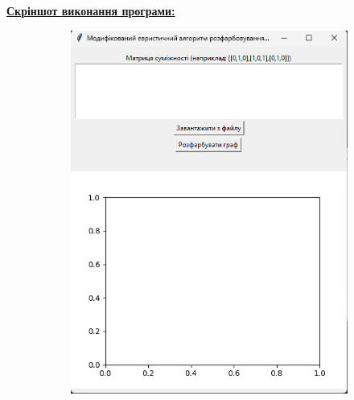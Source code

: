 \documentclass[12pt,a4paper]{article}
\begin{document}
    \newpage

    \textbf{\underline{Скріншот виконання програми:}}

    \begin{figure}[htbp]
        \begin{subfigure}{0.35\textwidth}
            \includegraphics[width=\linewidth]{ex0.png}
            \label{fig:a}
        \end{subfigure}
        \begin{subfigure}{0.33\textwidth}

\end{subfigure}
\end{figure}
\end{document}
